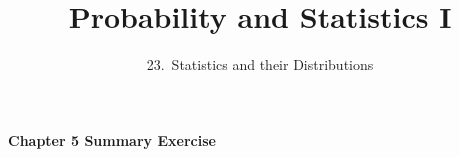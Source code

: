 

\hypersetup{
  colorlinks=true,
  linkcolor=blue,
  filecolor=magenta,      
  urlcolor=blue,
}
  
\newcommand{\lecturenum}{23}

\title[SS2857]{Probability and Statistics I}
\subtitle{\lecturenum.~Statistics and their Distributions}

\date{}






{

\begin{frame}
  \addtocounter{framenumber}{-1}

  \maketitle
\end{frame}
}

\begin{frame}
  \frametitle{}
  
  \begin{center}
    \Large{\textbf{Chapter 5 Summary Exercise}}

    \bigskip

  \end{center}
  
\end{frame}





